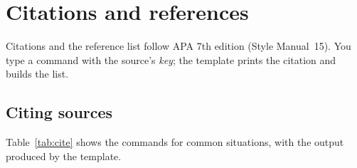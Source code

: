 \documentclass[11pt,a4paper]{article}
\begin{document}
\clearpage
\section{Citations and references}\label{sec:refs}

Citations and the reference list follow APA 7th edition (Style Manual~15). You
type a command with the source's \emph{key}; the template prints the citation
and builds the list.

\subsection{Citing sources}

Table~\ref{tab:cite} shows the commands for common situations, with the output
produced by the template.
\end{document}
